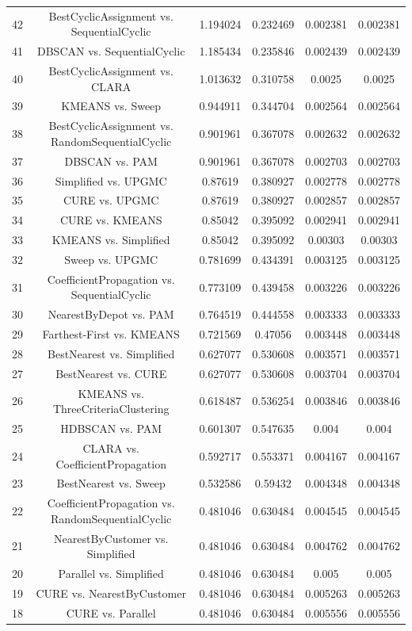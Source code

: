 \documentclass[a4paper,10pt]{article}
\begin{document}
\begin{landscape}
\begin{table}[!htp]
\begin{tabular}{cccccc}
42&BestCyclicAssignment vs. SequentialCyclic&1.194024&0.232469&0.002381&0.002381\\
41&DBSCAN vs. SequentialCyclic&1.185434&0.235846&0.002439&0.002439\\
40&BestCyclicAssignment vs. CLARA&1.013632&0.310758&0.0025&0.0025\\
39&KMEANS vs. Sweep&0.944911&0.344704&0.002564&0.002564\\
38&BestCyclicAssignment vs. RandomSequentialCyclic&0.901961&0.367078&0.002632&0.002632\\
37&DBSCAN vs. PAM&0.901961&0.367078&0.002703&0.002703\\
36&Simplified vs. UPGMC&0.87619&0.380927&0.002778&0.002778\\
35&CURE vs. UPGMC&0.87619&0.380927&0.002857&0.002857\\
34&CURE vs. KMEANS&0.85042&0.395092&0.002941&0.002941\\
33&KMEANS vs. Simplified&0.85042&0.395092&0.00303&0.00303\\
32&Sweep vs. UPGMC&0.781699&0.434391&0.003125&0.003125\\
31&CoefficientPropagation vs. SequentialCyclic&0.773109&0.439458&0.003226&0.003226\\
30&NearestByDepot vs. PAM&0.764519&0.444558&0.003333&0.003333\\
29&Farthest-First vs. KMEANS&0.721569&0.47056&0.003448&0.003448\\
28&BestNearest vs. Simplified&0.627077&0.530608&0.003571&0.003571\\
27&BestNearest vs. CURE&0.627077&0.530608&0.003704&0.003704\\
26&KMEANS vs. ThreeCriteriaClustering&0.618487&0.536254&0.003846&0.003846\\
25&HDBSCAN vs. PAM&0.601307&0.547635&0.004&0.004\\
24&CLARA vs. CoefficientPropagation&0.592717&0.553371&0.004167&0.004167\\
23&BestNearest vs. Sweep&0.532586&0.59432&0.004348&0.004348\\
22&CoefficientPropagation vs. RandomSequentialCyclic&0.481046&0.630484&0.004545&0.004545\\
21&NearestByCustomer vs. Simplified&0.481046&0.630484&0.004762&0.004762\\
20&Parallel vs. Simplified&0.481046&0.630484&0.005&0.005\\
19&CURE vs. NearestByCustomer&0.481046&0.630484&0.005263&0.005263\\
18&CURE vs. Parallel&0.481046&0.630484&0.005556&0.005556\\

\end{tabular}
\end{table}
\end{landscape}
\end{document}
